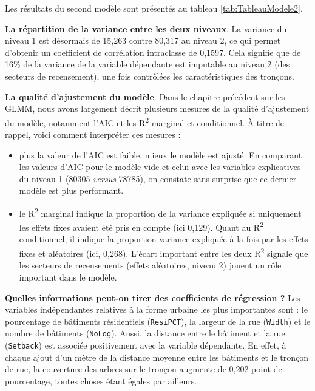 \documentclass[
  11pt,
  french,
]{book}
\begin{document}
Les résultats du second modèle sont présentés au tableau \ref{tab:TableauModele2}.

\textbf{La répartition de la variance entre les deux niveaux}. La variance du niveau 1 est désormais de 15,263 contre 80,317 au niveau 2, ce qui permet d'obtenir un coefficient de corrélation intraclasse de 0,1597. Cela signifie que de 16\% de la variance de la variable dépendante est imputable au niveau 2 (des secteurs de recensement), une fois contrôlées les caractéristiques des tronçons.

\textbf{La qualité d'ajustement du modèle}. Dans le chapitre précédent sur les GLMM, nous avons largement décrit plusieurs mesures de la qualité d'ajustement du modèle, notamment l'AIC et les R\textsuperscript{2} marginal et conditionnel. À titre de rappel, voici comment interpréter ces mesures :

\begin{itemize}
\item
  plus la valeur de l'AIC est faible, mieux le modèle est ajusté. En comparant les valeurs d'AIC pour le modèle vide et celui avec les variables explicatives du niveau 1 (80305 \emph{versus} 78785), on constate sans surprise que ce dernier modèle est plus performant.
\item
  le R\textsuperscript{2} marginal indique la proportion de la variance expliquée si uniquement les effets fixes avaient été pris en compte (ici 0,129). Quant au R\textsuperscript{2} conditionnel, il indique la proportion variance expliquée à la fois par les effets fixes et aléatoires (ici, 0,268). L'écart important entre les deux R\textsuperscript{2} signale que les secteurs de recensements (effets aléatoires, niveau 2) jouent un rôle important dans le modèle.
\end{itemize}

\textbf{Quelles informations peut-on tirer des coefficients de régression ?}
Les variables indépendantes relatives à la forme urbaine les plus importantes sont : le pourcentage de bâtiments résidentiels (\texttt{ResiPCT}), la largeur de la rue (\texttt{Width}) et le nombre de bâtiments (\texttt{NoLog}). Aussi, la distance entre le bâtiment et la rue (\texttt{Setback}) est associée positivement avec la variable dépendante. En effet, à chaque ajout d'un mètre de la distance moyenne entre les bâtiments et le tronçon de rue, la couverture des arbres sur le tronçon augmente de 0,202 point de pourcentage, toutes choses étant égales par ailleurs.
\end{document}
